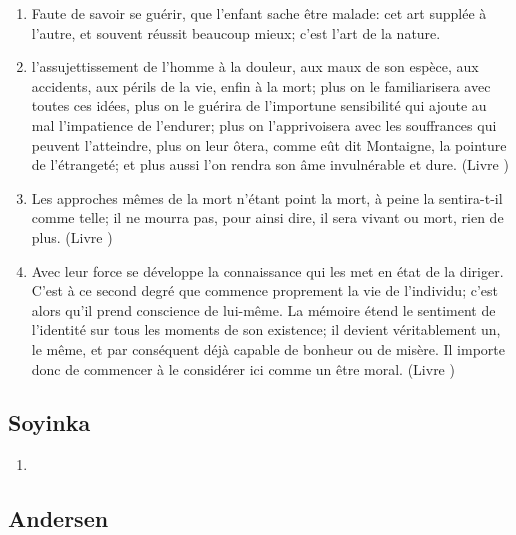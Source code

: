 \documentclass[a4paper, 11pt, hidelinks]{article}
\newcommand{\rb}[1]{\Romanbar{#1}}
\begin{document}
\begin{enumerate}
    \item Faute de savoir se guérir, que l'enfant sache être malade: cet art supplée à l'autre, et souvent réussit beaucoup mieux; c'est l'art de la nature. \rb{1}
    \item l'assujettissement de l'homme à la douleur, aux maux de son espèce, aux accidents, aux périls de la vie, enfin à la mort; plus on le familiarisera avec toutes ces idées, plus on le guérira de l'importune sensibilité qui ajoute au mal l'impatience de l'endurer; plus on l'apprivoisera avec les souffrances qui peuvent l'atteindre, plus on leur ôtera, comme eût dit Montaigne, la pointure de l'étrangeté; et plus aussi l'on rendra son âme invulnérable et dure. (Livre \rb{2})
    \item Les approches mêmes de la mort n'étant point la mort, à peine la sentira-t-il comme telle; il ne mourra pas, pour ainsi dire, il sera vivant ou mort, rien de plus. (Livre \rb{2})
    \item Avec leur force se développe la connaissance qui les met en état de la diriger. C'est à ce second degré que commence proprement la vie de l'individu; c'est alors qu'il prend conscience de lui-même. La mémoire étend le sentiment de l'identité sur tous les moments de son existence; il devient véritablement un, le même, et par conséquent déjà capable de bonheur ou de misère. Il importe donc de commencer à le considérer ici comme un être moral. (Livre \rb{2})
\end{enumerate}



\subsection{Soyinka}


\begin{enumerate}
    \item
\end{enumerate}




\subsection{Andersen}
\end{document}
